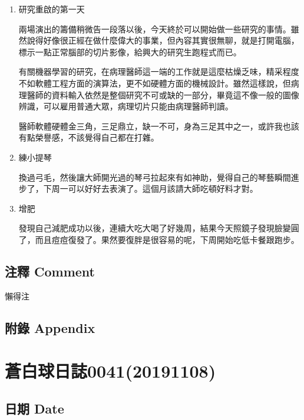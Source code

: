 \documentclass[a5paper, 12pt
]{book}
\begin{document}
\begin{enumerate}
\def\labelenumi{\arabic{enumi}.}
\item
  研究重啟的第一天

  兩場演出的籌備稍微告一段落以後，今天終於可以開始做一些研究的事情。雖然說得好像很正經在做什麼偉大的事業，但內容其實很無聊，就是打開電腦，標示一點正常腦部的切片影像，給興大的研究生跑程式而已。

  有關機器學習的研究，在病理醫師這一端的工作就是這麼枯燥乏味，精采程度不如軟體工程方面的演算法，更不如硬體方面的機械設計。雖然這樣說，但病理醫師的資料輸入依然是整個研究不可或缺的一部分，畢竟這不像一般的圖像辨識，可以雇用普通大眾，病理切片只能由病理醫師判讀。

  醫師軟體硬體金三角，三足鼎立，缺一不可，身為三足其中之一，或許我也該有點榮譽感，不該覺得自己都在打雜。
\item
  練小提琴

  換過弓毛，然後讓大師開光過的琴弓拉起來有如神助，覺得自己的琴藝瞬間進步了，下周一可以好好去表演了。這個月該請大師吃頓好料才對。
\item
  增肥

  發現自己減肥成功以後，連續大吃大喝了好幾周，結果今天照鏡子發現臉變圓了，而且痘痘復發了。果然要復胖是很容易的呢，下周開始吃低卡餐跟跑步。
\end{enumerate}

\hypertarget{ux6ce8ux91cb-comment-33}{%
\subsection{注釋 Comment}\label{ux6ce8ux91cb-comment-33}}

懶得注

\hypertarget{ux9644ux9304-appendix-32}{%
\subsection{附錄 Appendix}\label{ux9644ux9304-appendix-32}}

\hypertarget{ux84bcux767dux7403ux65e5ux8a8c004120191108}{%
\section{蒼白球日誌0041(20191108)}\label{ux84bcux767dux7403ux65e5ux8a8c004120191108}}

\hypertarget{ux65e5ux671f-date-40}{%
\subsection{日期 Date}\label{ux65e5ux671f-date-40}}
\end{document}
